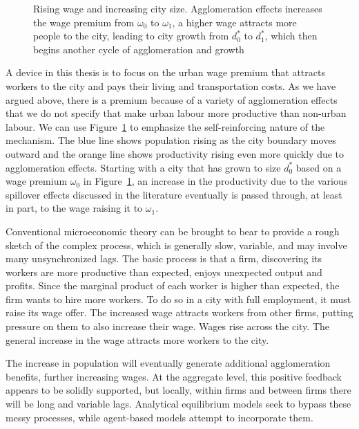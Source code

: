 \begin{figure}[!tb]
\begin{center}

\end{center}
\caption[Rising wage and increasing city size]{Rising wage and increasing city size. Agglomeration effects increases the wage premium from $\omega_0$ to $\omega_1$, a higher wage attracts more people to the city, leading to city growth from $d_0^*$ to $d_1^*$, which then begins another cycle of agglomeration and growth }
\label{fig-rising-wages}
\end{figure}

A device in this thesis is to focus on the urban wage premium that attracts workers to the city and pays their living and transportation costs. 
As we have argued above, there is a premium because of a variety of agglomeration effects that we do not specify that make urban labour more productive than non-urban labour. %
We can use Figure~\ref{fig-rising-wages} to emphasize the self-reinforcing nature of the mechanism. 
The blue line  shows population rising as the city boundary moves outward and the orange line shows productivity rising even more quickly due to agglomeration effects. 
Starting with a city that has grown to size $d_0^*$ based on a wage premium $\omega_0$ in Figure~\ref{fig-rising-wages}, an increase in the productivity due to the various spillover effects discussed in the literature eventually is passed through, at least in part, to the wage raising it to $\omega_1$. 

Conventional microeconomic theory can be brought to bear to provide a rough sketch of the  complex process, which is generally slow, variable, and may involve many unsynchronized lags.  The basic process is that a firm, discovering its workers are  more productive than expected, enjoys unexpected output and profits. Since the marginal product of each worker is higher than expected, the firm  wants to hire more workers. To do so in a city with full employment, it must raise its wage offer. The increased wage attracts workers from other firms, putting pressure on them to also increase their wage. Wages rise across the city. The general increase in the wage attracts more workers to the city. 

The increase in population will eventually generate additional agglomeration benefits, further increasing wages. At the aggregate level, this positive feedback appears to be solidly supported, but locally, within firms and between firms there will be long and variable lags. Analytical equilibrium models seek to bypass these messy processes, while agent-based models attempt to incorporate them.

